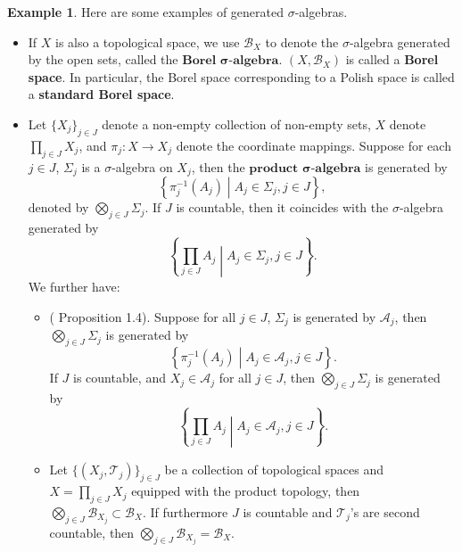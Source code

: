 \documentclass[openany]{book}
\theoremstyle{definition}
\newtheorem{example}{Example}[chapter]
\theoremstyle{remark}
\begin{document}
\begin{example}
    Here are some examples of generated $\sigma$-algebras.
    \begin{itemize}
        \item If $X$ is also a topological space, we use $\mathcal{B}_X$ to denote the $\sigma$-algebra generated by the open sets, called the $\textbf{Borel }\boldsymbol{\sigma}\textbf{-algebra}$. $(X,\mathcal{B}_X)$ is called a \textbf{Borel space}. In particular, the Borel space corresponding to a Polish space is called a \textbf{standard Borel space}.

        \item Let $\{X_j\}_{j\in J}$ denote a non-empty collection of non-empty sets, $X$ denote $\prod_{j\in J}X_j$, and $\pi_j:X\to X_j$ denote the coordinate mappings. Suppose for each $j\in J$, $\Sigma_j$ is a $\sigma$-algebra on $X_j$, then the $\textbf{product }\boldsymbol{\sigma}\textbf{-algebra}$ is generated by
        \begin{equation*}
            \left\{\pi_j^{-1}(A_j)\middle|A_j\in\Sigma_j,j\in J\right\},
        \end{equation*}
        denoted by $\bigotimes_{j\in J}\Sigma_j$. If $J$ is countable, then it coincides with the $\sigma$-algebra generated by
        \begin{equation*}
            \left\{\prod_{j\in J}A_j\middle|A_j\in\Sigma_j,j\in J\right\}.
        \end{equation*}
        We further have:
        \begin{itemize}
            \item (\cite{F13} Proposition 1.4). Suppose for all $j\in J$, $\Sigma_j$ is generated by $\mathcal{A}_j$, then $\bigotimes_{j\in J}\Sigma_j$ is generated by
            \begin{equation*}
                \left\{\pi_j^{-1}(A_j)\middle|A_j\in \mathcal{A}_j,j\in J\right\}.
            \end{equation*}
            If $J$ is countable, and $X_j\in \mathcal{A}_j$ for all $j\in J$, then $\bigotimes_{j\in J}\Sigma_j$ is generated by
            \begin{equation*}
                \left\{\prod_{j\in J}A_j\middle|A_j\in \mathcal{A}_j,j\in J\right\}.
            \end{equation*}

            \item Let $\{(X_j,\mathcal{T}_j)\}_{j\in J}$ be a collection of topological spaces and $X=\prod_{j\in J}X_j$ equipped with the product topology, then $\bigotimes_{j\in J}\mathcal{B}_{X_j}\subset \mathcal{B}_X$. If furthermore $J$ is countable and $\mathcal{T}_j$'s are second countable, then $\bigotimes_{j\in J}\mathcal{B}_{X_j}=\mathcal{B}_X$.
        \end{itemize}
    \end{itemize}
\end{example}
\end{document}
